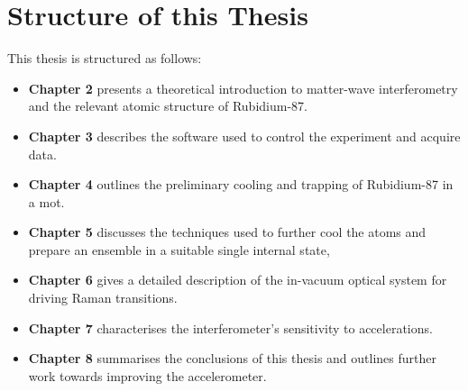 \section{Structure of this Thesis}
This thesis is structured as follows:
\begin{itemize}
  \item \textbf{Chapter 2} presents a theoretical introduction to
    matter-wave interferometry and the relevant atomic structure of
    Rubidium-87.
  \item \textbf{Chapter 3} describes the software used to control the
    experiment and acquire data.
  \item \textbf{Chapter 4} outlines the preliminary cooling and
    trapping of Rubidium-87 in a \ac{mot}.
  \item \textbf{Chapter 5} discusses the techniques used to further
    cool the atoms and prepare an ensemble in a suitable single internal state,
  \item \textbf{Chapter 6} gives a detailed description of the
    in-vacuum optical system for driving Raman transitions.
  \item \textbf{Chapter 7} characterises the interferometer's
    sensitivity to accelerations.
  \item \textbf{Chapter 8} summarises the conclusions of this thesis and outlines
    further work towards improving the accelerometer.
\end{itemize}



